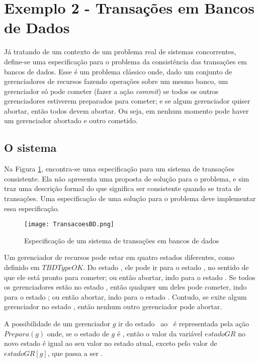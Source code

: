 \section{Exemplo 2 - Transações em Bancos de Dados}
\label{exemplo2}

Já tratando de um contexto de um problema real de sistemas concorrentes, define-se uma especificação para o problema da consistência das transações em bancos de dados. Esse é um problema clássico onde, dado um conjunto de gerenciadores de recursos fazendo operações sobre um mesmo banco, um gerenciador só pode cometer (fazer a ação \textit{commit}) se todos os outros gerenciadores estiverem preparados para cometer; e se algum gerenciador quiser abortar, então todos devem abortar. Ou seja, em nenhum momento pode haver um gerenciador abortado e outro cometido.

\subsection{O sistema}

Na Figura \ref{fig:ex2tla}, encontra-se uma especificação para um sistema de transações consistente. Ela não apresenta uma proposta de solução para o problema, e sim traz uma descrição formal do que significa ser consistente quando se trata de transações. Uma especificação de uma solução para o problema deve implementar essa especificação.

\begin{figure}[h]
  \centering
  \texttt{[image: TransacoesBD.png]}
  \caption{Especificação de um sistema de transações em bancos de dados}
\label{fig:ex2tla}
\end{figure}

Um gerenciador de recursos pode estar em quatro estados diferentes, como definido em $TBDTypeOK$. Do estado \trabalhando, ele pode ir para o estado \preparado, no sentido de que ele está pronto para cometer; ou então abortar, indo para o estado \abortado. Se todos os gerenciadores estão no estado \preparado, então qualquer um deles pode cometer, indo para o estado \cometido; ou então abortar, indo para o estado \abortado. Contudo, se exite algum gerenciador no estado \cometido, então nenhum outro gerenciador pode abortar.

A possibilidade de um gerenciador $g$ ir do estado \trabalhando\ ao \preparado\ é representada pela ação $Prepara(g)$ onde, se o estado de $g$ é \trabalhando, então o valor da variável $estadoGR$ no novo estado é igual ao seu valor no estado atual, exceto pelo valor de $estadoGR[g]$, que passa a ser \preparado.

